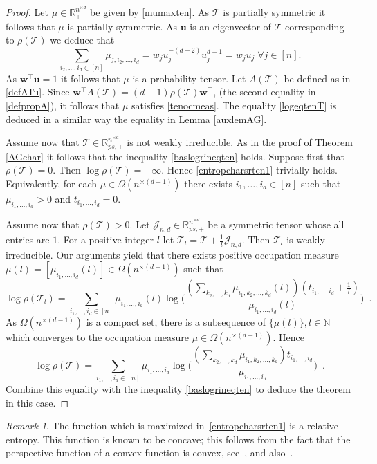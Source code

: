 \documentclass{amsart}
\newcommand{\N}{\mathbb{N}}
\newcommand{\R}{\mathbb{R}}
\newcommand{\uu}{\mathbf{u}}
\newcommand{\w}{\mathbf{w}}
\newcommand{\0}{\mathbf{0}}
\newcommand{\1}{\mathbf{1}}
\newcommand{\cJ}{\mathcal{J}}
\newcommand{\cT}{\mathcal{T}}
\newcommand{\trans}{^\top}
\theoremstyle{remark}
\newtheorem{rem}{Remark}
\numberwithin{equation}{section} %
\begin{document}
\begin{proof}
Let $\mu\in\R_+^{n^{\times d}}$ be given by \eqref{mumaxten}.  As $\cT$ is partially symmetric it follows that $\mu$ is partially symmetric.  As $\uu$ is an eigenvector of $\cT$ corresponding to $\rho(\cT)$ we deduce that 
\[\sum_{i_2,\ldots,i_d\in[n]} \mu_{j,i_2,\ldots,i_d}=w_j u_{j}^{-(d-2)}u_j^{d-1}=w_j u_j \; \forall j\in [n].\]
As $\w\trans\uu=1$ it follows that $\mu$ is a probability tensor.  Let $A(\cT)$ be defined as in \eqref{defATu}.  Since $\w\trans A(\cT)=(d-1)\rho(\cT)\w\trans$, (the second equality in \eqref{defpropA}), it follows that $\mu$ satisfies \eqref{tenocmeas}. 
The equality \eqref{logeqtenT} is deduced in a similar way the equality in Lemma \ref{auxlemAG}.  

 Assume now that $\cT\in\R_{ps,+}^{n^{\times d}}$ is not weakly irreducible.  As in the proof of Theorem \ref{AGchar} it follows that the inequality \eqref{baslogrineqten} holds.  Suppose first that $\rho(\cT)=0$.  Then $\log\rho(\cT)=-\infty$.  Hence \eqref{entropcharsrten1} trivially holds.  Equivalently, for each $\mu\in\Omega(n^{\times (d-1)})$ there exists $i_1,\ldots,i_d\in[n]$ such that $\mu_{i_1,\ldots,i_d}>0$ and $t_{i_1,\ldots,i_d}=0$.
 
 Assume now that $\rho(\cT)>0$.    Let $\cJ_{n,d}\in\R_{ps,+}^{n^{\times d}}$ be a symmetric tensor whose all entries are $1$.  For a positive integer $l$ let $\cT_l=\cT+\frac{1}{l} \cJ_{n,d}$.  Then $\cT_l$ is weakly irreducible.  Our arguments yield that there exists positive occupation measure $\mu(l)=[\mu_{i_1,\ldots,i_d}(l)]\in\Omega(n^{\times (d-1)})$ such that 
 \[\log\rho(\cT_l)=\sum_{i_1,\dots,i_d\in [n]}
\mu_{i_1,\dots, i_d}(l) \log \Big(\frac{(\sum_{k_2,\dots, k_d}\mu_{i_1,k_2,\dots, k_d}(l))(t_{i_1,\dots, i_d}+\frac{1}{l})}{\mu_{i_1,\dots, i_d}(l)}\Big) \enspace .\]
As $\Omega(n^{\times (d-1)})$ is a compact set, there is a subsequence of $\{\mu(l)\},l\in \N$ which converges to the occupation measure $\mu\in\Omega(n^{\times (d-1)})$.  Hence
\[\log\rho(\cT)=\sum_{i_1,\dots,i_d\in [n]}
\mu_{i_1,\dots, i_d} \log \Big(\frac{(\sum_{k_2,\dots, k_d}\mu_{i_1,k_2,\dots, k_d})t_{i_1,\dots, i_d}}{\mu_{i_1,\dots, i_d}}\Big) \enspace .\]
Combine this equality with  the inequality \eqref{baslogrineqten} to deduce the theorem in this case.\end{proof} 
 

\begin{rem}
  The function which is maximized in~\eqref{entropcharsrten1}
  is a relative entropy. This function is known to be concave; this follows
  from the fact that the perspective function of a convex function
  is convex, see~\cite[\S~3.2.6]{boyd}, and also~\cite{CS16}.
  \end{rem}
\end{document}
